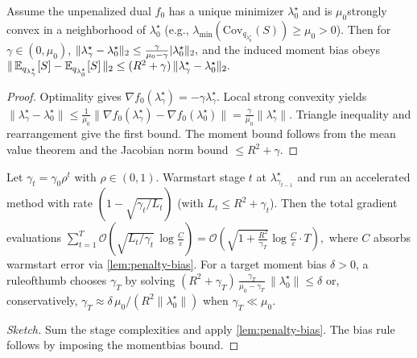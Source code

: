 \begin{lemma}\label{lem:penalty-bias}
Assume the unpenalized dual $f_0$ has a unique minimizer $\lambda^\star_0$ and is $\mu_0$\textendash strongly convex in a neighborhood of $\lambda^\star_0$ (e.g., $\lambda_{\min}(\mathrm{Cov}_{q_{\lambda^\star_0}}(S))\ge \mu_0>0$). Then for $\gamma\in(0,\mu_0)$,
$
\|\lambda^\star_\gamma-\lambda^\star_0\|_2\le \frac{\gamma}{\mu_0-\gamma}\,\\|\lambda^\star_0\|_2,
$
and the induced moment bias obeys
$
\|\,\mathbb{E}_{q_{\lambda^\star_\gamma}}[S]-\mathbb{E}_{q_{\lambda^\star_0}}[S]\,\|_2 \le (R^2+\gamma)\,\|\lambda^\star_\gamma-\lambda^\star_0\|_2.
$
\end{lemma}
\begin{proof}
Optimality gives $\nabla f_0(\lambda^\star_\gamma)=-\gamma\lambda^\star_\gamma$. Local strong convexity yields
$
\|\lambda^\star_\gamma-\lambda^\star_0\|\le \frac{1}{\mu_0}\|\nabla f_0(\lambda^\star_\gamma)-\nabla f_0(\lambda^\star_0)\|= \frac{\gamma}{\mu_0}\|\lambda^\star_\gamma\|.
$
Triangle inequality and rearrangement give the first bound. The moment bound follows from the mean value theorem and the Jacobian norm bound $\le R^2+\gamma$.
\end{proof}

\begin{proposition}\label{prop:continuation}
Let $\gamma_t=\gamma_0 \rho^t$ with $\rho\in(0,1)$. Warm\textendash start stage $t$ at $\lambda^\star_{\gamma_{t-1}}$ and run an accelerated method with rate $(1-\sqrt{\gamma_t/L_t})$ (with $L_t\le R^2+\gamma_t$). Then the total gradient evaluations
$
\sum_{t=1}^{T} \mathcal{O}\!\left(\sqrt{L_t/\gamma_t}\,\log\frac{C}{\varepsilon}\right)
= \mathcal{O}\!\left(\sqrt{1+\tfrac{R^2}{\gamma_T}}\log\frac{C}{\varepsilon}\cdot T\right),
$
where $C$ absorbs warm\textendash start error via \cref{lem:penalty-bias}. For a target moment bias $\delta>0$, a rule\textendash of\textendash thumb chooses $\gamma_T$ by solving
$
(R^2+\gamma_T)\,\frac{\gamma_T}{\mu_0-\gamma_T}\,\|\lambda^\star_0\| \le \delta
$
or, conservatively, $\gamma_T \approx \delta\,\mu_0/(R^2\|\lambda^\star_0\|)$ when $\gamma_T\ll \mu_0$.
\end{proposition}
\begin{proof}[Sketch]
Sum the stage complexities and apply \cref{lem:penalty-bias}. The bias rule follows by imposing the moment\textendash bias bound.
\end{proof}

